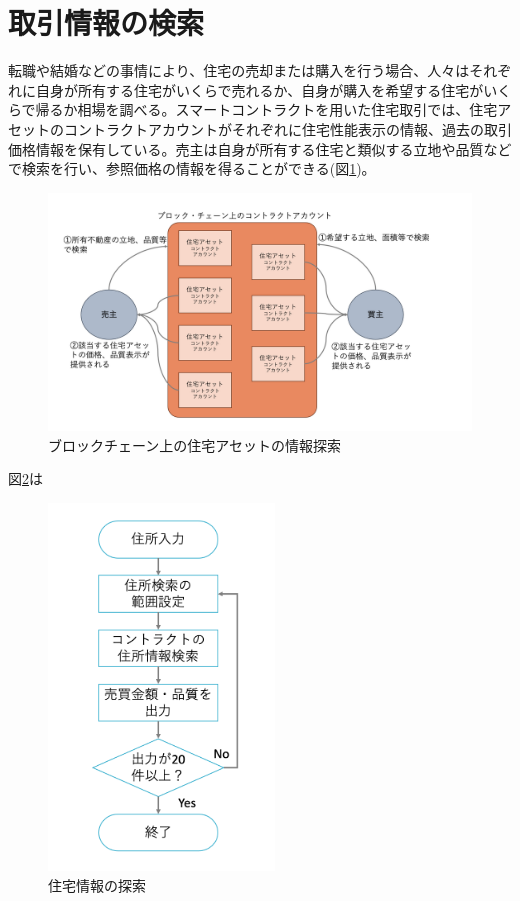 \documentclass[a4paper,fontsize=11pt,report,notitlepage,line_length=38zw,number_of_lines=40,dvipdfmx]{jlreq}
\begin{document}
\section{取引情報の検索}
転職や結婚などの事情により、住宅の売却または購入を行う場合、人々はそれぞれに自身が所有する住宅がいくらで売れるか、自身が購入を希望する住宅がいくらで帰るか相場を調べる。スマートコントラクトを用いた住宅取引では、住宅アセットのコントラクトアカウントがそれぞれに住宅性能表示の情報、過去の取引価格情報を保有している。売主は自身が所有する住宅と類似する立地や品質などで検索を行い、参照価格の情報を得ることができる(図\ref{search})。

\begin{figure}
 \centering
 \includegraphics[width=15cm]{search.png}
 \caption{ブロックチェーン上の住宅アセットの情報探索}
 \label{search}
\end{figure}

図\ref{flow}は
\begin{figure}
 \centering
 \includegraphics[width=6cm]{flow.png}
 \caption{住宅情報の探索}
 \label{flow}
\end{figure}
\end{document}
